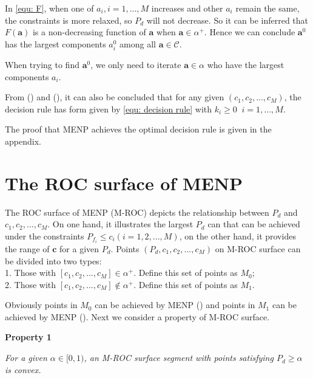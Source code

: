 \documentclass[12pt,journal,a4paper,twoside,doublecolumn]{IEEEtran}
\newcommand{\rmnum}[1]{\romannumeral #1}
\begin{document}
\begin{spacing}{1.0}
In \eqref{equ: F}, when one of $a_i, i = 1, ..., M$ increases and other $a_i$ remain the same, the constraints is more relaxed, so $P_d$ will not decrease. So it can be inferred that $F(\mathbf{a})$ is a non-decreasing function of $\mathbf{a}$ when $\mathbf{a} \in \alpha^+$. Hence we can conclude $\mathbf{a}^0$ has the largest components $a_i^0$ among all $\mathbf{a} \in \mathcal{C}$. 

When trying to find $\mathbf{a}^0$, we only need to iterate $\mathbf{a} \in \alpha$ who have the largest components $a_i$.

From (\rmnum{1}) and (\rmnum{2}), it can also be concluded that for any given $(c_1, c_2, ..., c_M)$, the decision rule has form given by \eqref{equ: decision rule} with $k_i \geq 0\;\;i=1, ..., M$.

The proof that MENP achieves the optimal decision rule is given in the appendix.

\section{The ROC surface of MENP}

The ROC surface of MENP (M-ROC) depicts the relationship between $P_d$ and $c_1, c_2, ..., c_M$. On one hand, it  illustrates the largest $P_d$ can that can be achieved under the constraints $P_{f_i} \leq c_i (i = 1, 2, ..., M)$, on the other hand, it provides the range of $\mathbf{c}$ for a given $P_d$.
Points $(P_d, c_1, c_2, ..., c_M)$ on M-ROC  surface can be divided into two types: 
\\1. Those with $[c_1, c_2, ..., c_M] \in \alpha^+$. Define this set of points as $M_0$; 
\\2. Those with $[c_1, c_2, ..., c_M] \notin \alpha^+$. Define this set of points as $M_1$. 

Obviously points in $M_0$ can be achieved by MENP (\rmnum{1}) and points in $M_1$ can  be achieved by MENP (\rmnum{2}). Next we consider a property of M-ROC surface.

\noindent\textbf{Property 1}

\noindent  \textit{
\noindent For a given $\alpha \in [0,1)$, an M-ROC surface segment with points satisfying $P_d \geq \alpha$ is  convex.
}


\end{spacing}
\end{document}
